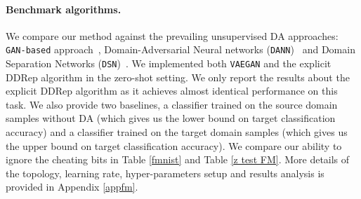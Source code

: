 \documentclass{article}
\begin{document}




\paragraph{Benchmark algorithms.}
We compare our method against the prevailing unsupervised DA approaches: \verb"GAN-based" approach~\cite{singla2020preparing}, Domain-Adversarial Neural networks (\verb"DANN")~\cite{ganin2016domain} and Domain Separation Networks (\verb"DSN")~\cite{bousmalis2016domain}. We implemented both \verb"VAEGAN" and the explicit DDRep algorithm in the zero-shot setting. We only report the results about the explicit DDRep algorithm as it achieves almost identical performance on this task. We also provide two baselines, a classifier trained on the source domain samples without DA (which gives us the lower bound on target classification accuracy) and a classifier trained on the 
target domain samples (which gives us the upper bound on target classification accuracy).  We compare our ability to ignore the cheating bits in Table \ref{fmnist} and Table \ref{z test FM}. More details of the topology, learning rate, hyper-parameters setup and results analysis is provided in Appendix \ref{appfm}.
\end{document}

